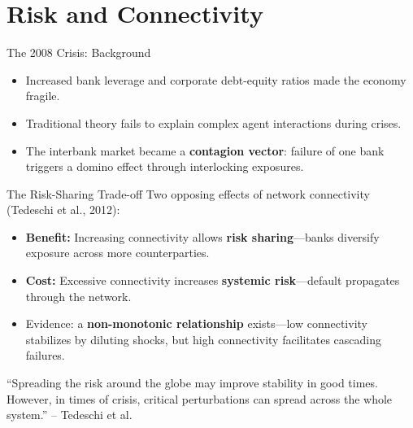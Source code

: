 \section{Risk and Connectivity}\label{sec:2}

\begin{frame}{The 2008 Crisis: Background}
  \begin{itemize}
    \item Increased bank leverage and corporate debt-equity ratios made the economy fragile.
    \item Traditional theory fails to explain complex agent interactions during crises.
    \item The interbank market became a \textbf{contagion vector}: failure of one bank triggers a domino effect through interlocking exposures.
  \end{itemize}
\end{frame}

\begin{frame}{The Risk-Sharing Trade-off}
  Two opposing effects of network connectivity (Tedeschi et al., 2012):
  \begin{itemize}
    \item \textbf{Benefit:} Increasing connectivity allows \textbf{risk sharing}---banks diversify exposure across more counterparties.
    \item \textbf{Cost:} Excessive connectivity increases \textbf{systemic risk}---default propagates through the network.
    \item Evidence: a \textbf{non-monotonic relationship} exists---low connectivity stabilizes by diluting shocks, but high connectivity facilitates cascading failures.
  \end{itemize}
  \vspace{0.3cm}
  ``Spreading the risk around the globe may improve stability in good times. However, in times of crisis, critical perturbations can spread across the whole system.'' -- Tedeschi et al.
\end{frame}

